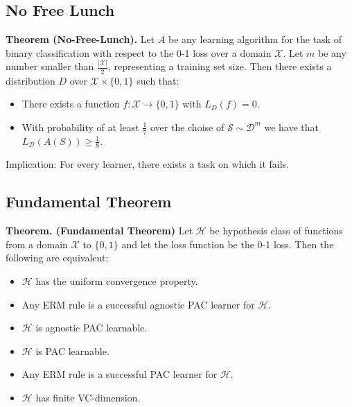 \documentclass{article}
\begin{document}
   \subsection{No Free Lunch}
   \textbf{Theorem (No-Free-Lunch).} Let $A$ be any learning algorithm for the task of binary classification with respect to the 0-1 loss over a domain $\mathcal{X}$. Let $m$ be any number smaller than $\frac{|\mathcal{X}|}{2}$, representing a training set size. Then there exists a distribution $D$ over $\mathcal{X} \times \{0,1\}$ such that:
   \begin{itemize}
   \item There exists a function $f:\mathcal{X} \rightarrow \{0,1\}$ with $L_D(f) = 0$.
   \item With probability of at least $\frac{1}{7}$ over the choise of $\mathcal{S} \sim \mathcal{D}^m$ we have that $L_\mathcal{D}(A(S)) \geq \frac{1}{8}$.
   \end{itemize}
   Implication: For every learner, there exists a task on which it fails.
   
   \subsection{Fundamental Theorem}
   \textbf{Theorem. (Fundamental Theorem)} Let $\mathcal{H}$ be hypothesis class of functions from a domain $\mathcal{X}$ to $\{0,1\}$ and let the loss function be the 0-1 loss. Then the following are equivalent:
   \begin{itemize}
   \item $\mathcal{H}$ has the uniform convergence property.
   \item Any ERM rule is a successful agnostic PAC learner for $\mathcal{H}$.
   \item $\mathcal{H}$ is agnostic PAC learnable.
   \item $\mathcal{H}$ is PAC learnable.
   \item Any ERM rule is a successful PAC learner for $\mathcal{H}$.
   \item $\mathcal{H}$ has finite VC-dimension.
   \end{itemize}
   
\end{document}
